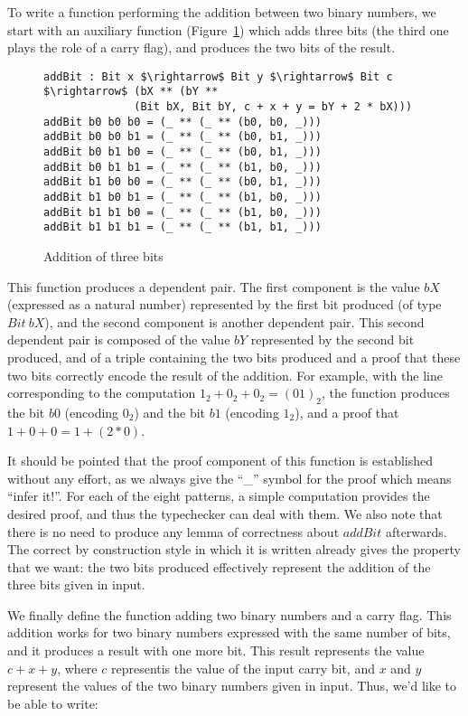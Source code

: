 To write a function performing the addition between two binary numbers,
we start with an auxiliary function (Figure~\ref{addbit}) which adds three bits
(the third one plays the role of a carry flag), and produces the two bits of
the result.

\begin{figure}[H]
\figrule
\begin{center}
\begin{lstlisting}
addBit : Bit x $\rightarrow$ Bit y $\rightarrow$ Bit c $\rightarrow$ (bX ** (bY ** 
              (Bit bX, Bit bY, c + x + y = bY + 2 * bX)))
addBit b0 b0 b0 = (_ ** (_ ** (b0, b0, _)))
addBit b0 b0 b1 = (_ ** (_ ** (b0, b1, _)))
addBit b0 b1 b0 = (_ ** (_ ** (b0, b1, _)))
addBit b0 b1 b1 = (_ ** (_ ** (b1, b0, _)))
addBit b1 b0 b0 = (_ ** (_ ** (b0, b1, _)))
addBit b1 b0 b1 = (_ ** (_ ** (b1, b0, _)))
addBit b1 b1 b0 = (_ ** (_ ** (b1, b0, _)))
addBit b1 b1 b1 = (_ ** (_ ** (b1, b1, _)))
\end{lstlisting}
\end{center}
\caption{Addition of three bits}
\label{addbit}
\figrule
\end{figure}

This function produces a dependent pair. The first component is the value $bX$
(expressed as a natural number) represented by the first bit produced (of type
$Bit\ bX$), and the second component is another dependent pair. This
second dependent pair is composed of the value $bY$ represented by the second
bit produced, and of a triple containing the two bits produced and a
proof that these two bits correctly encode the result of the addition.
For example, with the line corresponding to the computation
$1_2 + 0_2 + 0_2 = (01)_2$, the function produces the bit $b0$ (encoding $0_2$)
and the bit $b1$ (encoding $1_2$), and a proof that $1 + 0 + 0 = 1 + (2*0)$.

It should be pointed that the proof component of this function is established
without any effort, as we always give the ``\_'' symbol for the proof which means
``infer it!''. For each of the eight patterns, a simple computation provides the
desired proof, and thus the typechecker can deal with them.  We also note that
there is no need to produce any lemma of correctness about $addBit$ afterwards.
The correct by construction style in which it is written already gives the
property that we want: the two bits produced effectively represent the
addition of the three bits given in input.

We finally define the function adding two binary numbers and a carry flag.
This addition works for two binary numbers
expressed with the same number of bits, and it produces a result with one more
bit. This result represents the value $c + x + y$, where $c$ 
representis the value of the input carry bit, and $x$ and $y$ represent
the values of the two binary numbers given in input. Thus, we'd like to
be able to write:

